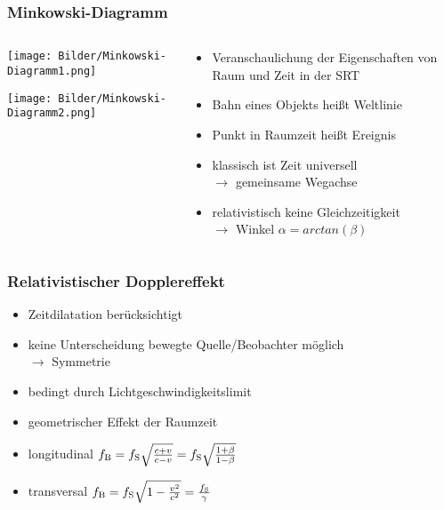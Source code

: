\documentclass{beamer}
\begin{document}
\begin{frame}\frametitle{Minkowski-Diagramm}

\begin{columns}

\begin{column}{.48\textwidth}

\centering

\texttt{[image: Bilder/Minkowski-Diagramm1.png]}

\texttt{[image: Bilder/Minkowski-Diagramm2.png]}

\end{column}

\hfill

\begin{column}{.48\textwidth}

\begin{itemize}
\item Veranschaulichung der Eigenschaften von Raum und Zeit in der SRT
\item Bahn eines Objekts heißt \glqq Weltlinie\grqq
\item Punkt in Raumzeit heißt \glqq Ereignis\grqq
\item klassisch ist Zeit universell\\ $\to$ gemeinsame Wegachse
\item relativistisch keine Gleichzeitigkeit\\ $\to$ Winkel $\alpha = arctan(\beta)$
\end{itemize}

\end{column}

\end{columns}

\end{frame}

\begin{frame}\frametitle{Relativistischer Dopplereffekt}

\begin{itemize}
\item Zeitdilatation berücksichtigt
\item keine Unterscheidung bewegte Quelle/Beobachter möglich\\ $\to$ Symmetrie
\item bedingt durch Lichtgeschwindigkeitslimit
\item geometrischer Effekt der Raumzeit
\item longitudinal \quad $f_{\rm B} = f_{\rm S} \sqrt{\frac{c+v}{c-v}} = f_{\rm S} \sqrt{\frac{1+\beta}{1-\beta}}$
\item transversal \quad $f_{\rm B} = f_{\rm S} \sqrt{1-\frac{v^2}{c^2}} = \frac{f_{\rm S}}{\gamma}$
\end{itemize}

\end{frame}
\end{document}
